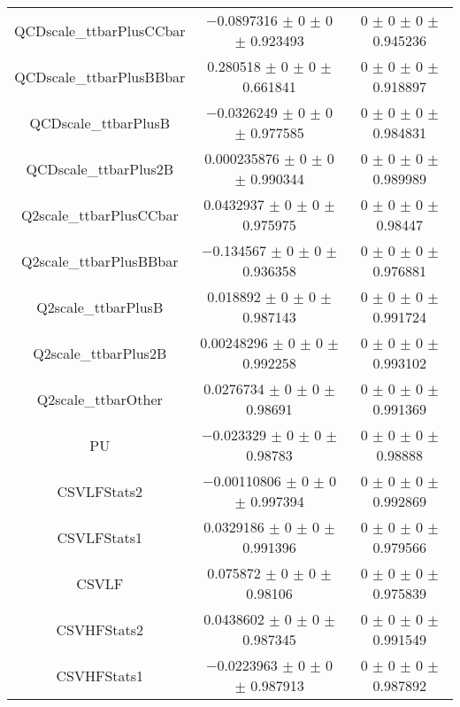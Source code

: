 \begin{table}
\begin{tabular}{ccc}
QCDscale\_ttbarPlusCCbar & \num{-0.0897316} $\pm$ \num{0} $\pm$ \num{0} $\pm$ \num{0.923493} & \num{0} $\pm$ \num{0} $\pm$ \num{0} $\pm$ \num{0.945236}\\
QCDscale\_ttbarPlusBBbar & \num{0.280518} $\pm$ \num{0} $\pm$ \num{0} $\pm$ \num{0.661841} & \num{0} $\pm$ \num{0} $\pm$ \num{0} $\pm$ \num{0.918897}\\
QCDscale\_ttbarPlusB & \num{-0.0326249} $\pm$ \num{0} $\pm$ \num{0} $\pm$ \num{0.977585} & \num{0} $\pm$ \num{0} $\pm$ \num{0} $\pm$ \num{0.984831}\\
QCDscale\_ttbarPlus2B & \num{0.000235876} $\pm$ \num{0} $\pm$ \num{0} $\pm$ \num{0.990344} & \num{0} $\pm$ \num{0} $\pm$ \num{0} $\pm$ \num{0.989989}\\
Q2scale\_ttbarPlusCCbar & \num{0.0432937} $\pm$ \num{0} $\pm$ \num{0} $\pm$ \num{0.975975} & \num{0} $\pm$ \num{0} $\pm$ \num{0} $\pm$ \num{0.98447}\\
Q2scale\_ttbarPlusBBbar & \num{-0.134567} $\pm$ \num{0} $\pm$ \num{0} $\pm$ \num{0.936358} & \num{0} $\pm$ \num{0} $\pm$ \num{0} $\pm$ \num{0.976881}\\
Q2scale\_ttbarPlusB & \num{0.018892} $\pm$ \num{0} $\pm$ \num{0} $\pm$ \num{0.987143} & \num{0} $\pm$ \num{0} $\pm$ \num{0} $\pm$ \num{0.991724}\\
Q2scale\_ttbarPlus2B & \num{0.00248296} $\pm$ \num{0} $\pm$ \num{0} $\pm$ \num{0.992258} & \num{0} $\pm$ \num{0} $\pm$ \num{0} $\pm$ \num{0.993102}\\
Q2scale\_ttbarOther & \num{0.0276734} $\pm$ \num{0} $\pm$ \num{0} $\pm$ \num{0.98691} & \num{0} $\pm$ \num{0} $\pm$ \num{0} $\pm$ \num{0.991369}\\
PU & \num{-0.023329} $\pm$ \num{0} $\pm$ \num{0} $\pm$ \num{0.98783} & \num{0} $\pm$ \num{0} $\pm$ \num{0} $\pm$ \num{0.98888}\\
CSVLFStats2 & \num{-0.00110806} $\pm$ \num{0} $\pm$ \num{0} $\pm$ \num{0.997394} & \num{0} $\pm$ \num{0} $\pm$ \num{0} $\pm$ \num{0.992869}\\
CSVLFStats1 & \num{0.0329186} $\pm$ \num{0} $\pm$ \num{0} $\pm$ \num{0.991396} & \num{0} $\pm$ \num{0} $\pm$ \num{0} $\pm$ \num{0.979566}\\
CSVLF & \num{0.075872} $\pm$ \num{0} $\pm$ \num{0} $\pm$ \num{0.98106} & \num{0} $\pm$ \num{0} $\pm$ \num{0} $\pm$ \num{0.975839}\\
CSVHFStats2 & \num{0.0438602} $\pm$ \num{0} $\pm$ \num{0} $\pm$ \num{0.987345} & \num{0} $\pm$ \num{0} $\pm$ \num{0} $\pm$ \num{0.991549}\\
CSVHFStats1 & \num{-0.0223963} $\pm$ \num{0} $\pm$ \num{0} $\pm$ \num{0.987913} & \num{0} $\pm$ \num{0} $\pm$ \num{0} $\pm$ \num{0.987892}\\

\end{tabular}
\end{table}

